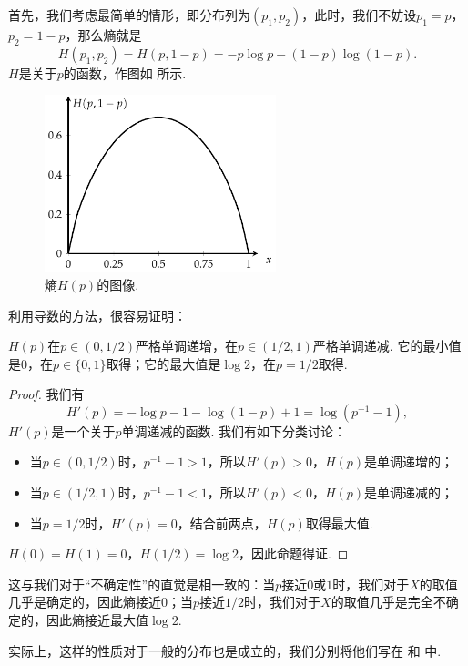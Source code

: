首先，我们考虑最简单的情形，即分布列为$(p_1,p_2)$，此时，我们不妨设$p_1=p$，$p_2=1-p$，那么熵就是
    \[H(p_1,p_2)=H(p,1-p)=-p\log p-(1-p)\log(1-p).\]
$H$是关于$p$的函数，作图如 所示.
\begin{figure}[ht]
        \centering
        \includegraphics[width=0.6\textwidth]{figures/information-theory/entropy-figure.pdf}
        \caption{熵$H(p)$的图像.}
        \label{fig:entropy-figure}
\end{figure}

利用导数的方法，很容易证明：
\begin{proposition}\label{prop:entropy-2prob}
    $H(p)$在$p\in (0,1/2)$严格单调递增，在$p\in (1/2,1)$严格单调递减. 它的最小值是$0$，在$p\in\{0,1\}$取得；它的最大值是$\log 2$，在$p=1/2$取得.    
\end{proposition}
\begin{proof}
    我们有
    \[H'(p)=-\log p-1-\log(1-p)+1=\log(p^{-1}-1),\]
    $H'(p)$是一个关于$p$单调递减的函数. 我们有如下分类讨论：
    \begin{itemize}
        \item 当$p\in (0,1/2)$时，$p^{-1}-1>1$，所以$H'(p)>0$，$H(p)$是单调递增的；
        \item 当$p\in (1/2,1)$时，$p^{-1}-1<1$，所以$H'(p)<0$，$H(p)$是单调递减的；
        \item 当$p=1/2$时，$H'(p)=0$，结合前两点，$H(p)$取得最大值. 
    \end{itemize}
    $H(0)=H(1)=0$，$H(1/2)=\log 2$，因此命题得证.
\end{proof}
这与我们对于“不确定性”的直觉是相一致的：当$p$接近$0$或$1$时，我们对于$X$的取值几乎是确定的，因此熵接近$0$；当$p$接近$1/2$时，我们对于$X$的取值几乎是完全不确定的，因此熵接近最大值$\log 2$. 
 
实际上，这样的性质对于一般的分布也是成立的，我们分别将他们写在 和 中.

